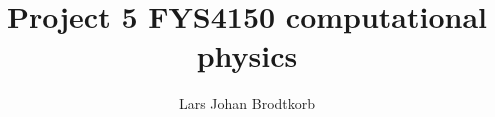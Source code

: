 \documentclass[10pt,a4paper]{article}
\begin{document}
\title{Project 5 FYS4150 computational physics}
\author{Lars Johan Brodtkorb}
\maketitle


\tableofcontents
\newpage






%
%
\end{document}
